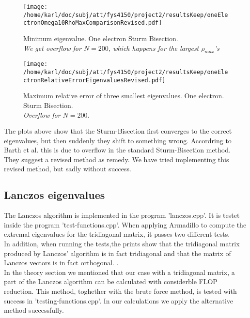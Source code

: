 \documentclass{article}
\begin{document}
\begin{minipage}{.49\textwidth} %
	\begin{figure}[H]
		\centering
		\texttt{[image: /home/karl/doc/subj/att/fys4150/project2/resultsKeep/oneElectronOmega10RhoMaxComparisonRevised.pdf]}
		\caption{Minimum eigenvalue. One electron Sturm Bisection.\\ \textit{We get overflow for $N=200$, which happens for the largest $\rho_{max}$'s}}
		\label{1}
	\end{figure}
\end{minipage}\hfill
\begin{minipage}{.49\textwidth}
	\begin{figure}[H]
		\centering
		\texttt{[image: /home/karl/doc/subj/att/fys4150/project2/resultsKeep/oneElectronRelativeErrorEigenvaluesRevised.pdf]}
		\caption{Maximum relative error of three smallest eigenvalues. One electron. Sturm Bisection.\\ \textit{Overflow for $N=200$.}}
		\label{1}
	\end{figure}
\end{minipage}\hfill
\vspace{2ex}

The plots above show that the Sturm-Bisection first converges to the correct eigenvalues, but then suddenly they shift to something wrong. Accordring to Barth et al. \cite{barth} this is due to overflow in the standard Sturm-Bisection method. They suggest a revised method as remedy. We have tried implementing this revised method, but sadly without success.

\subsection{Lanczos eigenvalues}
The Lanczos algorithm is implemented in the program 'lanczos.cpp'. It is testet inside the program 'test-functions.cpp'. When applying Armadillo to compute the extremal eigenvalues for the tridiagonal matrix, it passes two different tests. \\

In addition, when running the tests,the prints show that the tridiagonal matrix produced by Lanczos' algorithm is in fact tridiagonal and that the matrix of Lanczos vectors is in fact orthogonal. .\\

In the theory section we mentioned that our case with a tridiagonal matrix, a part of the Lanczos algorithm can be calculated with considerble FLOP reduction. This method, toghether with the brute force method, is tested with success in 'testing-functions.cpp'. In our calculations we apply the alternative method successfully. \\
\end{document}
